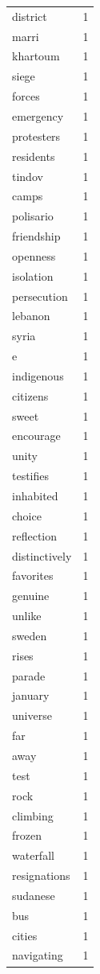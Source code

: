 \begin{tabular}{lr}
district & 1 \\
marri & 1 \\
khartoum & 1 \\
siege & 1 \\
forces & 1 \\
emergency & 1 \\
protesters & 1 \\
residents & 1 \\
tindov & 1 \\
camps & 1 \\
polisario & 1 \\
friendship & 1 \\
openness & 1 \\
isolation & 1 \\
persecution & 1 \\
lebanon & 1 \\
syria & 1 \\
e & 1 \\
indigenous & 1 \\
citizens & 1 \\
sweet & 1 \\
encourage & 1 \\
unity & 1 \\
testifies & 1 \\
inhabited & 1 \\
choice & 1 \\
reflection & 1 \\
distinctively & 1 \\
favorites & 1 \\
genuine & 1 \\
unlike & 1 \\
sweden & 1 \\
rises & 1 \\
parade & 1 \\
january & 1 \\
universe & 1 \\
far & 1 \\
away & 1 \\
test & 1 \\
rock & 1 \\
climbing & 1 \\
frozen & 1 \\
waterfall & 1 \\
resignations & 1 \\
sudanese & 1 \\
bus & 1 \\
cities & 1 \\
navigating & 1 \\

\end{tabular}
